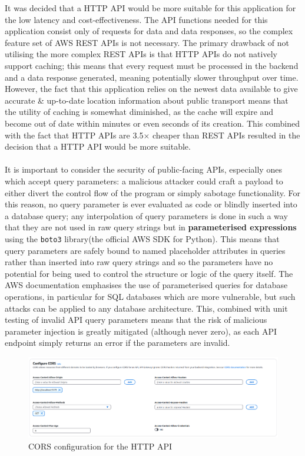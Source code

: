 \documentclass[a4paper,11pt]{report}
\begin{document}
It was decided that a HTTP API would be more suitable for this application for the low latency and cost-effectiveness.
The API functions needed for this application consist only of requests for data and data responses, so the complex feature set of AWS REST APIs is not necessary.
The primary drawback of not utilising the more complex REST APIs is that HTTP APIs do not natively support caching;
this means that every request must be processed in the backend and a data response generated, meaning potentially slower throughput over time.
However, the fact that this application relies on the newest data available to give accurate \& up-to-date location information about public transport means that the utility of caching is somewhat diminished, as the cache will expire and become out of date within minutes or even seconds of its creation.
This combined with the fact that HTTP APIs are 3.5$\times$ cheaper\supercite{apipricing} than REST APIs resulted in the decision that a HTTP API would be more suitable.
\\\\
It is important to consider the security of public-facing APIs, especially ones which accept query parameters: a malicious attacker could craft a payload to either divert the control flow of the program or simply sabotage functionality.
For this reason, no query parameter is ever evaluated as code or blindly inserted into a database query;
any interpolation of query parameters is done in such a way that they are not used in raw query strings but in \textbf{parameterised expressions} using the \texttt{boto3} library\supercite{boto3query}(the official AWS SDK for Python).
This means that query parameters are safely bound to named placeholder attributes in queries rather than inserted into raw query strings and so the parameters have no potential for being used to control the structure or logic of the query itself.
The AWS documentation emphasises the use of parameterised queries for database operations, in particular for SQL databases which are more vulnerable, but such attacks can be applied to any database architecture\supercite{useparameterisedqueries}. 
This, combined with unit testing of invalid API query parameters means that the risk of malicious parameter injection is greatly mitigated (although never zero), as each API endpoint simply returns an error if the parameters are invalid.

\begin{figure}[H]
    \centering
    \includegraphics[width=\textwidth]{./images/api_cors_configuration.png}
    \caption{CORS configuration for the HTTP API}
\end{figure}
\end{document}
